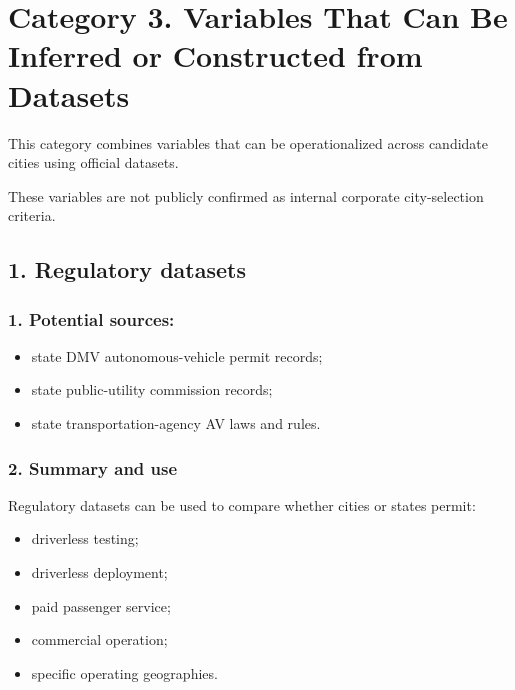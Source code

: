 \documentclass[10pt,a4paper]{article}
\providecommand{\tightlist}{\setlength{\itemsep}{0pt}\setlength{\parskip}{0pt}}
\begin{document}
\hypertarget{category-3.-variables-that-can-be-inferred-or-constructed-from-datasets}{%
\section{Category 3. Variables That Can Be Inferred or Constructed from Datasets}\label{category-3.-variables-that-can-be-inferred-or-constructed-from-datasets}}

This category combines variables that can be operationalized across candidate cities using official datasets.

These variables are not publicly confirmed as internal corporate city-selection criteria.

\hypertarget{regulatory-datasets}{%
\subsection{1. Regulatory datasets}\label{regulatory-datasets}}

\hypertarget{potential-sources}{%
\subsubsection{1. Potential sources:}\label{potential-sources}}

\begin{itemize}
\tightlist
\item
  state DMV autonomous-vehicle permit records;
\item
  state public-utility commission records;
\item
  state transportation-agency AV laws and rules.
\end{itemize}

\hypertarget{summary-and-use}{%
\subsubsection{2. Summary and use}\label{summary-and-use}}

Regulatory datasets can be used to compare whether cities or states permit:

\begin{itemize}
\tightlist
\item
  driverless testing;
\item
  driverless deployment;
\item
  paid passenger service;
\item
  commercial operation;
\item
  specific operating geographies.
\end{itemize}
\end{document}
